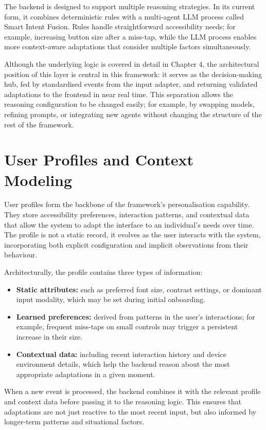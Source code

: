 \documentclass[openany]{book}
\begin{document}
The backend is designed to support multiple reasoning strategies. In its current form, it combines deterministic rules with a multi-agent LLM process called Smart Intent Fusion. Rules handle straightforward accessibility needs; for example, increasing button size after a miss-tap, while the LLM process enables more context-aware adaptations that consider multiple factors simultaneously.

Although the underlying logic is covered in detail in Chapter 4, the architectural position of this layer is central in this framework: it serves as the decision-making hub, fed by standardised events from the input adapter, and returning validated adaptations to the frontend in near real time. This separation allows the reasoning configuration to be changed easily; for example, by swapping models, refining prompts, or integrating new agents without changing the structure of the rest of the framework.

\section{User Profiles and Context Modeling}
User profiles form the backbone of the framework’s personalisation capability. They store accessibility preferences, interaction patterns, and contextual data that allow the system to adapt the interface to an individual’s needs over time. The profile is not a static record, it evolves as the user interacts with the system, incorporating both explicit configuration and implicit observations from their behaviour.

Architecturally, the profile contains three types of information:
\begin{itemize}
    \item \textbf{Static attributes:} such as preferred font size, contrast settings, or dominant input modality, which may be set during initial onboarding.
    \item \textbf{Learned preferences:} derived from patterns in the user’s interactions; for example, frequent miss-taps on small controls may trigger a persistent increase in their size.
    \item \textbf{Contextual data:} including recent interaction history and device environment details, which help the backend reason about the most appropriate adaptations in a given moment.
\end{itemize}
When a new event is processed, the backend combines it with the relevant profile and context data before passing it to the reasoning logic. This ensures that adaptations are not just reactive to the most recent input, but also informed by longer-term patterns and situational factors.
\end{document}
